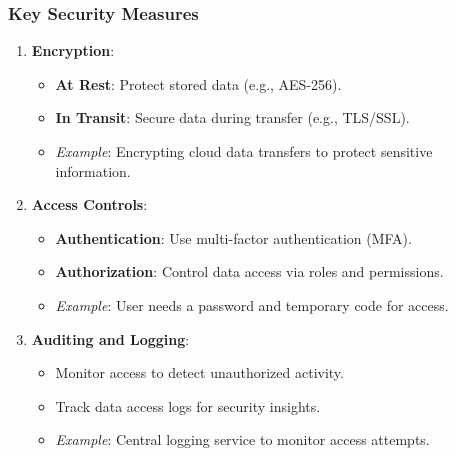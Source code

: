 \documentclass{beamer}
\begin{document}
\begin{frame}[fragile]
    \frametitle{Key Security Measures}
    \begin{enumerate}
        \item \textbf{Encryption}:
        \begin{itemize}
            \item \textbf{At Rest}: Protect stored data (e.g., AES-256).
            \item \textbf{In Transit}: Secure data during transfer (e.g., TLS/SSL).
            \item \textit{Example}: Encrypting cloud data transfers to protect sensitive information.
        \end{itemize}
        
        \item \textbf{Access Controls}:
        \begin{itemize}
            \item \textbf{Authentication}: Use multi-factor authentication (MFA).
            \item \textbf{Authorization}: Control data access via roles and permissions.
            \item \textit{Example}: User needs a password and temporary code for access.
        \end{itemize}
        
        \item \textbf{Auditing and Logging}:
        \begin{itemize}
            \item Monitor access to detect unauthorized activity.
            \item Track data access logs for security insights.
            \item \textit{Example}: Central logging service to monitor access attempts.
        \end{itemize}
    \end{enumerate}
\end{frame}
\end{document}
